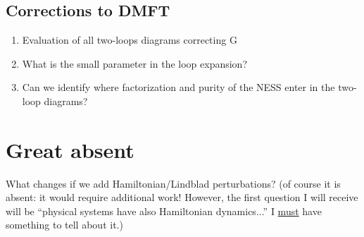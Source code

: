 \documentclass[a4paper,10pt]{article}
\theoremstyle{remark}
\begin{document}
   \subsection{Corrections to DMFT}
    \begin{enumerate}
     \item Evaluation of all two-loops diagrams correcting G
     \item What is the small parameter in the loop expansion?
     \item Can we identify where factorization and purity of the NESS enter in the two-loop diagrams?
    \end{enumerate}

  \section{Great absent}
    What changes if we add Hamiltonian/Lindblad perturbations? (of course it is absent: it would require additional work! However, the first question I will receive will be ``physical systems have also Hamiltonian dynamics...'' I \underline{must} have something to tell about it.)
    
\end{document}
